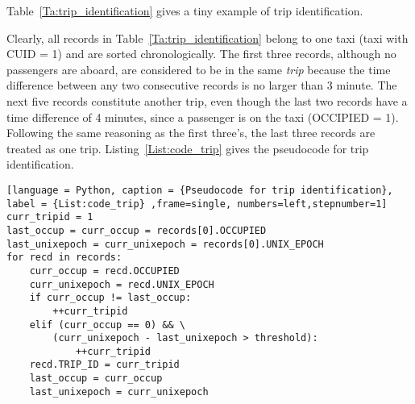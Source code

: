 Table~\ref{Ta:trip_identification} gives a tiny example of trip identification.

\begin{table}[h]
\centering
{}
\caption{An example of trip identification}\label{Ta:trip_identification}
\end{table}

Clearly, all records in Table~\ref{Ta:trip_identification} belong to one taxi (taxi with CUID = 1) and are sorted chronologically. The first three records, although no passengers are aboard, are considered to be in the same \emph{trip} because the time difference between any two consecutive records is no larger than 3 minute. The next five records constitute another trip, even though the last two records have a time difference of 4 minutes, since a passenger is on the taxi (OCCIPIED = 1). Following the same reasoning as the first three's, the last three records are treated as one trip. Listing~\ref{List:code_trip} gives the pseudocode for trip identification.

\begin{lstlisting}[language = Python, caption = {Pseudocode for trip identification}, label = {List:code_trip} ,frame=single, numbers=left,stepnumber=1]
curr_tripid = 1
last_occup = curr_occup = records[0].OCCUPIED
last_unixepoch = curr_unixepoch = records[0].UNIX_EPOCH
for recd in records:
	curr_occup = recd.OCCUPIED
	curr_unixepoch = recd.UNIX_EPOCH
	if curr_occup != last_occup:
		++curr_tripid
	elif (curr_occup == 0) && \
		(curr_unixepoch - last_unixepoch > threshold):
			++curr_tripid
	recd.TRIP_ID = curr_tripid
	last_occup = curr_occup
	last_unixepoch = curr_unixepoch
\end{lstlisting}

